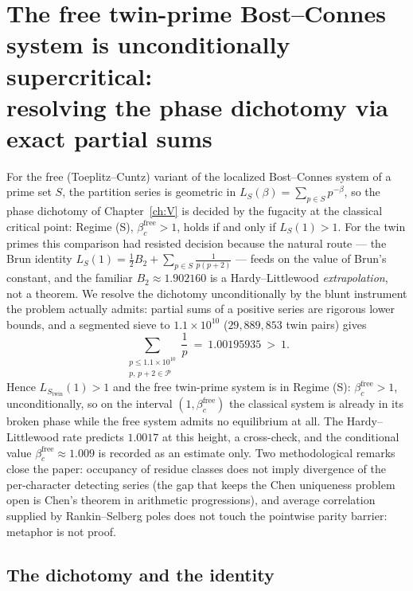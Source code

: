 \chapter[The free twin-prime system is supercritical]{The free twin-prime Bost--Connes system is unconditionally supercritical:\\ resolving the phase dichotomy via exact partial sums}\label{ch:XXXV}
\begin{summary}
For the free (Toeplitz--Cuntz) variant of the localized Bost--Connes system of a prime
set $S$, the partition series is geometric in $L_S(\beta)=\sum_{p\in S}p^{-\beta}$, so the
phase dichotomy of Chapter~\ref{ch:V} is decided by the fugacity at the classical critical point:
Regime (S), $\beta_c^{\mathrm{free}}>1$, holds if and only if $L_S(1)>1$. For the twin
primes this comparison had resisted decision because the natural route --- the Brun
identity $L_S(1)=\tfrac12B_2+\sum_{p\in S}\tfrac1{p(p+2)}$ --- feeds on the value of
Brun's constant, and the familiar $B_2\approx1.902160$ is a Hardy--Littlewood
\emph{extrapolation}, not a theorem. We resolve the dichotomy unconditionally by the
blunt instrument the problem actually admits: partial sums of a positive series are
rigorous lower bounds, and a segmented sieve to $1.1\times10^{10}$ ($29{,}889{,}853$ twin
pairs) gives
\[
\sum_{\substack{p\le1.1\times10^{10}\\ p,\,p+2\in\mathcal{P}}}\frac1p\ =\ 1.00195935\ >\ 1 .
\]
Hence $L_{S_{\mathrm{twin}}}(1)>1$ and the free twin-prime system is in Regime (S):
$\beta_c^{\mathrm{free}}>1$, unconditionally, so on the interval
$(1,\beta_c^{\mathrm{free}})$ the classical system is already in its broken phase while
the free system admits no equilibrium at all. The Hardy--Littlewood rate predicts
$1.0017$ at this height, a cross-check, and the conditional value
$\beta_c^{\mathrm{free}}\approx1.009$ is recorded as an estimate only. Two methodological
remarks close the paper: occupancy of residue classes does not imply divergence of the
per-character detecting series (the gap that keeps the Chen uniqueness problem open is
Chen's theorem in arithmetic progressions), and average correlation supplied by
Rankin--Selberg poles does not touch the pointwise parity barrier: metaphor is not proof.
\end{summary}


\section{The dichotomy and the identity}\label{XXXV:sec:identity}

